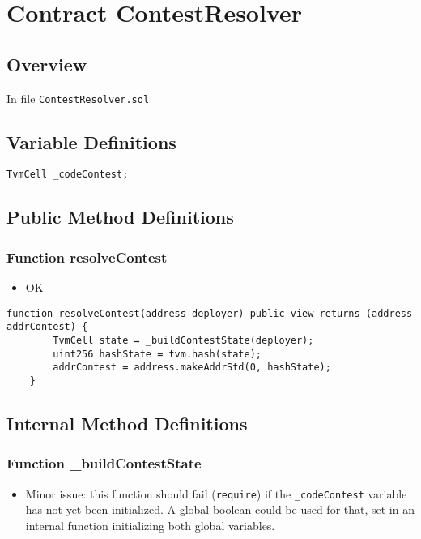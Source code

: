 
\chapter{Contract ContestResolver}

\minitoc

\section{Overview}


In file {\tt ContestResolver.sol}

\section{Variable Definitions}

\begin{lstlisting}[firstnumber=8]
    TvmCell _codeContest;
\end{lstlisting}

\section{Public Method Definitions}


\subsection{Function resolveContest}

\begin{itemize}
\item OK
\end{itemize}

\begin{lstlisting}[firstnumber=10]
    function resolveContest(address deployer) public view returns (address addrContest) {
        TvmCell state = _buildContestState(deployer);
        uint256 hashState = tvm.hash(state);
        addrContest = address.makeAddrStd(0, hashState);
    }
\end{lstlisting}

\section{Internal Method Definitions}


\subsection{Function \_{}buildContestState}

\begin{itemize}
\item Minor issue: this function should fail ({\tt require}) if the
  {\tt \_codeContest} variable has not yet been initialized. A global
  boolean could be used for that, set in an internal function
  initializing both global variables.
\end{itemize}

